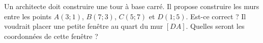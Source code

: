 
\begin{exercice}\label{exosmath-0574}

    Un architecte doit construire une tour à base carré. Il propose construire les murs entre les points \( A(3;1)\), \( B(7;3)\), \( C(5;7)\) et \( D(1;5)\). Est-ce correct ? Il voudrait placer une petite fenêtre au quart du mur \( [DA]\). Quelles seront les coordonnées de cette fenêtre ?

\end{exercice}
